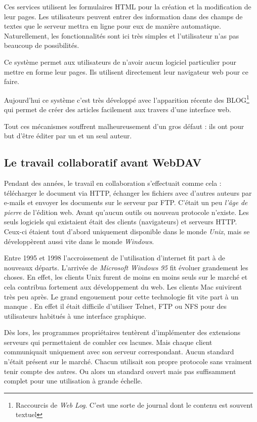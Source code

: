 \documentclass[a4paper, 11pt]{article}
\begin{document}
		Ces services utilisent les formulaires HTML pour la création et la modification de leur pages. Les utilisateurs peuvent entrer des information dans des champs de textes que le serveur mettra en ligne pour eux de manière automatique. Naturellement, les fonctionnalités sont ici très simples et l'utilisateur n'as pas beaucoup de possibilités. 
		
		Ce système permet aux utilisateurs de n'avoir aucun logiciel particulier pour mettre en forme leur pages. Ils utilisent directement leur navigateur web pour ce faire. 
		
		Aujourd'hui ce système c'est très développé avec l'apparition récente des BLOG\footnote{Raccourcis de \emph{Web Log}. C'est une sorte de journal dont le contenu est souvent textuel} qui permet de créer des articles facilement aux travers d'une interface web.
		
		Tout ces mécanismes souffrent malheureusement d'un gros défaut : ils ont pour but d'être éditer par un et un seul auteur. 

	\subsection{Le travail collaboratif avant WebDAV}

		Pendant des années, le travail en collaboration s'effectuait comme cela : télécharger le document via HTTP, échanger les fichiers avec d'autres auteurs par e-mails et envoyer les documents sur le serveur par FTP. C'était un peu \emph{l'âge de pierre} de l'édition web. Avant qu'aucun outils ou nouveau protocole n'existe. Les seuls logiciels qui existaient était des clients (navigateurs) et serveurs HTTP. Ceux-ci étaient tout d'abord uniquement disponible dans le monde \emph{Unix}, mais se développèrent aussi vite dans le monde \emph{Windows}.
		
		Entre 1995 et 1998 l'accroissement de l'utilisation d'internet fit part à de nouveaux départs. L'arrivée de \emph{Microsoft Windows 95} fit évoluer grandement les choses. En effet, les clients Unix furent de moins en moins seuls sur le marché et cela contribua fortement aux développement du web. Les clients Mac suivirent très peu après. Le grand engouement pour cette technologie fit vite part à un manque . En effet il était difficile d'utiliser Telnet, FTP ou NFS pour des utilisateurs habitués à une interface graphique. 
		
	Dès lors, les programmes propriétaires tentèrent d'implémenter des extensions serveurs qui permettaient de combler ces lacunes. Mais chaque client communiquait uniquement avec son serveur correspondant. Aucun standard n'était présent sur le marché. Chacun utilisait son propre protocole sans vraiment tenir compte des autres. Ou alors un standard ouvert mais pas suffisamment complet pour une utilisation à grande échelle.
		
\end{document}
